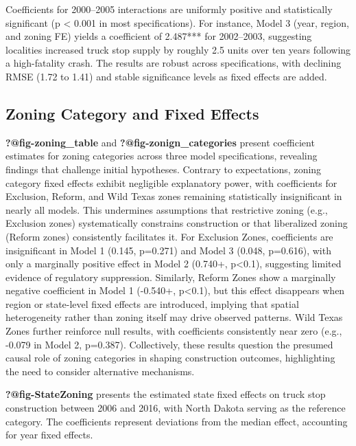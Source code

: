 \documentclass[
  12pt]{article}
\begin{document}
Coefficients for 2000--2005 interactions are uniformly positive and
statistically significant (p \textless{} 0.001 in most specifications).
For instance, Model 3 (year, region, and zoning FE) yields a coefficient
of 2.487*** for 2002--2003, suggesting localities increased truck stop
supply by roughly 2.5 units over ten years following a high-fatality
crash. The results are robust across specifications, with declining RMSE
(1.72 to 1.41) and stable significance levels as fixed effects are
added.

\subsection{Zoning Category and Fixed
Effects}\label{zoning-category-and-fixed-effects}

\textbf{?@fig-zoning\_table} and \textbf{?@fig-zonign\_categories}
present coefficient estimates for zoning categories across three model
specifications, revealing findings that challenge initial hypotheses.
Contrary to expectations, zoning category fixed effects exhibit
negligible explanatory power, with coefficients for Exclusion, Reform,
and Wild Texas zones remaining statistically insignificant in nearly all
models. This undermines assumptions that restrictive zoning (e.g.,
Exclusion zones) systematically constrains construction or that
liberalized zoning (Reform zones) consistently facilitates it. For
Exclusion Zones, coefficients are insignificant in Model 1 (0.145,
p=0.271) and Model 3 (0.048, p=0.616), with only a marginally positive
effect in Model 2 (0.740+, p\textless0.1), suggesting limited evidence
of regulatory suppression. Similarly, Reform Zones show a marginally
negative coefficient in Model 1 (-0.540+, p\textless0.1), but this
effect disappears when region or state-level fixed effects are
introduced, implying that spatial heterogeneity rather than zoning
itself may drive observed patterns. Wild Texas Zones further reinforce
null results, with coefficients consistently near zero (e.g., -0.079 in
Model 2, p=0.387). Collectively, these results question the presumed
causal role of zoning categories in shaping construction outcomes,
highlighting the need to consider alternative mechanisms.

\textbf{?@fig-StateZoning} presents the estimated state fixed effects on
truck stop construction between 2006 and 2016, with North Dakota serving
as the reference category. The coefficients represent deviations from
the median effect, accounting for year fixed effects.
\end{document}
